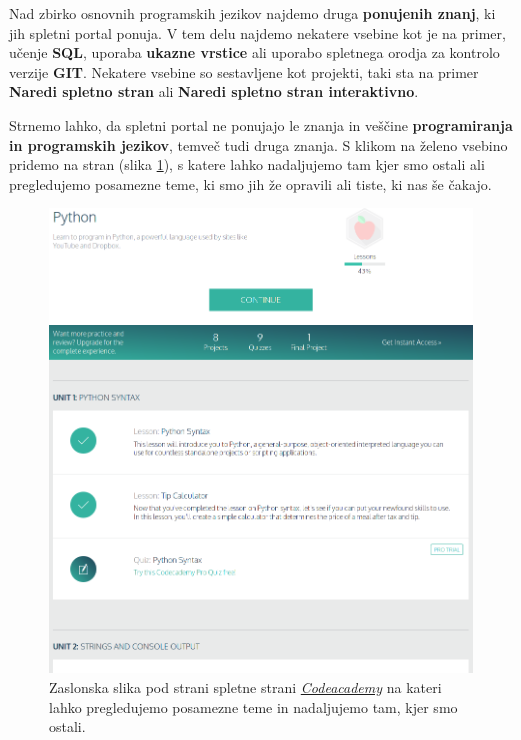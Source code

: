 Nad zbirko osnovnih programskih jezikov najdemo druga
\textbf{ponujenih znanj}, ki jih spletni portal ponuja. V tem delu
najdemo nekatere vsebine kot je na primer, učenje \textbf{SQL},
uporaba \textbf{ukazne vrstice} ali uporabo spletnega orodja za
kontrolo verzije \textbf{GIT}. Nekatere vsebine so sestavljene kot
projekti, taki sta na primer \textbf{Naredi spletno stran} ali
\textbf{Naredi spletno stran interaktivno}.


Strnemo lahko, da spletni portal ne ponujajo le znanja in veščine
\textbf{programiranja in programskih jezikov}, temveč tudi druga
znanja. S klikom na želeno vsebino pridemo na stran (slika
\ref{fig:scr:web:codeacademy:tema}), s katere lahko nadaljujemo tam
kjer smo ostali ali pregledujemo posamezne teme, ki smo jih že
opravili ali tiste, ki nas še čakajo.

\begin{figure}[h!]
  \centering
    \includegraphics [width=0.65\linewidth, keepaspectratio =
    1] {./images/sc_web/codeacademy_tema_01.png}
%  
  \caption{Zaslonska slika pod strani spletne strani
      \emph{\href{https://www.codecademy.com/}{Codeacademy}}
      \cite{web:codeacademy} na kateri lahko pregledujemo posamezne
      teme in nadaljujemo tam, kjer smo ostali.}
    \label{fig:scr:web:codeacademy:tema}
\end{figure}

